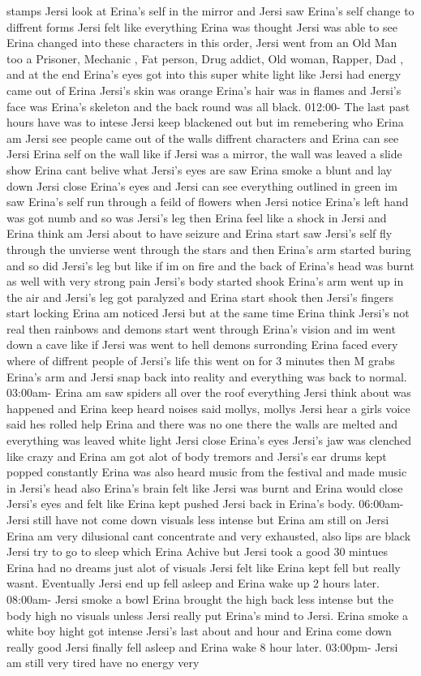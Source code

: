 \documentclass[12pt]{book}
\begin{document}
stamps Jersi look at Erina's self in the mirror and Jersi saw Erina's self change to diffrent forms Jersi felt like everything Erina was thought Jersi was able to see Erina changed into these characters in this order, Jersi went from an Old Man too a Prisoner, Mechanic , Fat person, Drug addict, Old woman, Rapper, Dad , and at the end Erina's eyes got into this super white light like Jersi had energy came out of Erina Jersi's skin was orange Erina's hair was in flames and Jersi's face was Erina's skeleton and the back round was all black. 012:00- The last past hours have was to intese Jersi keep blackened out but im remebering who Erina am Jersi see people came out of the walls diffrent characters and Erina can see Jersi Erina self on the wall like if Jersi was a mirror, the wall was leaved a slide show Erina cant belive what Jersi's eyes are saw Erina smoke a blunt and lay down Jersi close Erina's eyes and Jersi can see everything outlined in green im saw Erina's self run through a feild of flowers when Jersi notice Erina's left hand was got numb and so was Jersi's leg then Erina feel like a shock in Jersi and Erina think am Jersi about to have seizure and Erina start saw Jersi's self fly through the unvierse went through the stars and then Erina's arm started buring and so did Jersi's leg but like if im on fire and the back of Erina's head was burnt as well with very strong pain Jersi's body started shook Erina's arm went up in the air and Jersi's leg got paralyzed and Erina start shook then Jersi's fingers start locking Erina am noticed Jersi but at the same time Erina think Jersi's not real then rainbows and demons start went through Erina's vision and im went down a cave like if Jersi was went to hell demons surronding Erina faced every where of diffrent people of Jersi's life this went on for 3 minutes then M grabs Erina's arm and Jersi snap back into reality and everything was back to normal. 03:00am- Erina am saw spiders all over the roof everything Jersi think about was happened and Erina keep heard noises said mollys, mollys Jersi hear a girls voice said hes rolled help Erina and there was no one there the walls are melted and everything was leaved white light Jersi close Erina's eyes Jersi's jaw was clenched like crazy and Erina am got alot of body tremors and Jersi's ear drums kept popped constantly Erina was also heard music from the festival and made music in Jersi's head also Erina's brain felt like Jersi was burnt and Erina would close Jersi's eyes and felt like Erina kept pushed Jersi back in Erina's body. 06:00am- Jersi still have not come down visuals less intense but Erina am still on Jersi Erina am very dilusional cant concentrate and very exhausted, also lips are black Jersi try to go to sleep which Erina Achive but Jersi took a good 30 mintues Erina had no dreams just alot of visuals Jersi felt like Erina kept fell but really wasnt. Eventually Jersi end up fell asleep and Erina wake up 2 hours later. 08:00am- Jersi smoke a bowl Erina brought the high back less intense but the body high no visuals unless Jersi really put Erina's mind to Jersi. Erina smoke a white boy hight got intense Jersi's last about and hour and Erina come down really good Jersi finally fell asleep and Erina wake 8 hour later. 03:00pm- Jersi am still very tired have no energy very 
\end{document}
